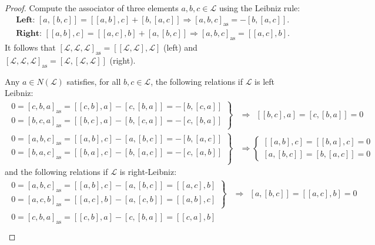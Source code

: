 \documentclass[10pt,a4paper]{amsart}
\begin{document}
			\begin{proof}
				Compute the associator of three elements $a,b,c\in\mathcal{L}$ using the Leibniz rule:
				\begin{align*}
					\textbf{Left: }[a,[b,c]]=[[a,b],c]+[b,[a,c]]\Rightarrow [a,b,c]_{\mathrm{as}}=-[b,[a,c]].\\
					\textbf{Right: }[[a,b],c]=[[a,c],b]+[a,[b,c]]\Rightarrow [a,b,c]_{\mathrm{as}}=[[a,c],b].
				\end{align*}
				It follows that $[\mathcal{L},\mathcal{L},\mathcal{L}]_{\mathrm{as}}=[[\mathcal{L},\mathcal{L}],\mathcal{L}]$ (left) and $[\mathcal{L},\mathcal{L},\mathcal{L}]_{\mathrm{as}}=[\mathcal{L},[\mathcal{L},\mathcal{L}]]$ (right).
				
				Any $a\in N(\mathcal{L})$ satisfies, for all $b,c\in\mathcal{L}$, the following relations if $\mathcal{L}$ is left Leibniz:
				\begin{align*}
					\left.\begin{array}{c}
						0=[c,b,a]_{\mathrm{as}}=[[c,b],a]-[c,[b,a]]=-[b,[c,a]]  \\
						0=[b,c,a]_{\mathrm{as}}=[[b,c],a]-[b,[c,a]]=-[c,[b,a]]
					\end{array}\right\}&\Rightarrow\ \ [[b,c],a]=[c,[b,a]]=0\\
					\left.\begin{array}{c}
						0=[a,b,c]_{\mathrm{as}}=[[a,b],c]-[a,[b,c]]=-[b,[a,c]]  \\
						0=[b,a,c]_{\mathrm{as}}=[[b,a],c]-[b,[a,c]]=-[c,[a,b]]  \\
					\end{array}\right\}&\Rightarrow \left\{\begin{matrix}
						[[a,b],c]=[[b,a],c]=0\\
						[a,[b,c]]=[b,[a,c]]=0
					\end{matrix} \right.
				\end{align*}
				and the following relations if $\mathcal{L}$ is right-Leibniz:
				\begin{align*}
					\left.\begin{array}{c}
						0=[a,b,c]_{\mathrm{as}}=[[a,b],c]-[a,[b,c]]=[[a,c],b]  \\
						0=[a,c,b]_{\mathrm{as}}=[[a,c],b]-[a,[c,b]]=[[a,b],c]
					\end{array}\right\}&\Rightarrow\ \ [a,[b,c]]=[[a,c],b]=0\\
					\left.\begin{array}{c}
						0=[c,b,a]_{\mathrm{as}}=[[c,b],a]-[c,[b,a]]=[[c,a],b]  \\

\end{array}
\end{align*}
\end{proof}
\end{document}
